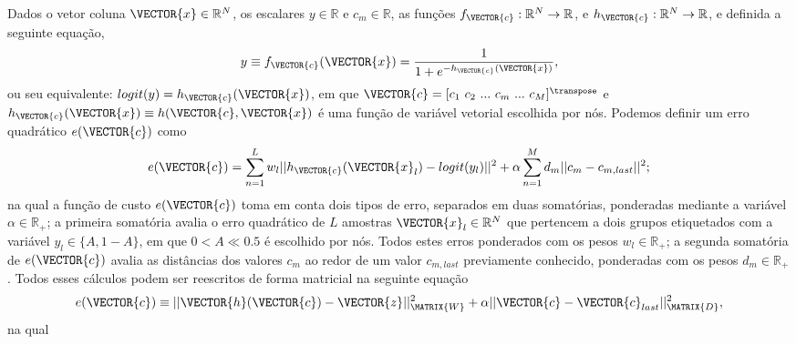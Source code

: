
\begin{myproofT}\label{proof:theo:reglogrnr1nolinear}
Dados
o vetor coluna $\VECTOR{x} \in \mathbb{R}^{N}$, os escalares $y \in \mathbb{R}$ e $c_m \in \mathbb{R}$,
as funções $f_{\VECTOR{c}}:\mathbb{R}^{N} \rightarrow \mathbb{R}$, 
e $h_{\VECTOR{c}}:\mathbb{R}^{N} \rightarrow \mathbb{R}$,  e 
definida a seguinte equação,
\begin{equation}\label{eq:proof:theo:reglogrnr1nolinear:1}
y\equiv f_{\VECTOR{c}}(\VECTOR{x})= \frac{1}{1+e^{-h_{\VECTOR{c}}(\VECTOR{x}) }},
\end{equation}
ou seu equivalente: $logit(y)=h_{\VECTOR{c}}(\VECTOR{x})$,
em que $\VECTOR{c}=[c_1~ c_2~ ...~ c_m~ ...~ c_{M}]^{\transpose}$ e
$h_{\VECTOR{c}}(\VECTOR{x})\equiv h(\VECTOR{c},\VECTOR{x})$ é uma função de variável vetorial escolhida por nós.
Podemos definir um erro quadrático $e(\VECTOR{c})$ como
\begin{equation}\label{eq:proof:theo:reglogrnr1nolinear:2}
e(\VECTOR{c}) =  
\sum_{n=1}^{L} w_l||h_{\VECTOR{c}}(\VECTOR{x}_l)-logit(y_l)||^2
+\alpha \sum_{n=1}^{M} d_m||c_m-c_{m,last}||^2;
\end{equation}
na qual a função de custo $e(\VECTOR{c})$ toma em conta dois tipos de erro, separados em duas somatórias,
ponderadas mediante a variável $\alpha \in \mathbb{R}_+$;
a primeira somatória avalia o erro quadrático de $L$ amostras $\VECTOR{x}_l \in \mathbb{R}^{N}$ que pertencem a 
dois grupos etiquetados com a variável $y_l\in \{A,1-A\}$, 
em que $0<A\ll 0.5$ é escolhido por nós.
Todos estes erros ponderados com os pesos $w_l \in \mathbb{R}_+$;
a segunda somatória de $e(\VECTOR{c})$ 
avalia as distâncias dos valores $c_m$ ao redor de um valor $c_{m,last}$
previamente conhecido,
ponderadas com os pesos $d_m \in \mathbb{R}_+$.
Todos esses cálculos podem ser reescritos de forma matricial
na seguinte equação
\begin{equation}\label{eq:proof:theo:reglogrnr1nolinear:3}
e(\VECTOR{c}) \equiv ||\VECTOR{h}(\VECTOR{c})-\VECTOR{z}||_{\MATRIX{W}}^2
+ \alpha ||\VECTOR{c}-\VECTOR{c}_{last}||_{\MATRIX{D}}^2 ,
\end{equation}
na qual
\begin{equation}\label{eq:proof:reglogrnr1nolinear:4}

\end{equation}
\end{myproofT}
